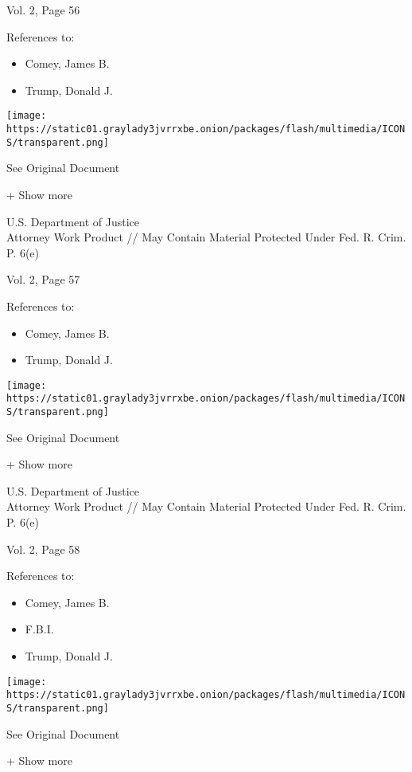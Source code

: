 Vol. 2, Page 56

References to:

\begin{itemize}
\tightlist
\item
  Comey, James B.
\item
  Trump, Donald J.
\end{itemize}

\protect\hyperlink{}{}

\texttt{[image: https://static01.graylady3jvrrxbe.onion/packages/flash/multimedia/ICONS/transparent.png]}

See Original Document

+ Show more

U.S. Department of Justice\\
Attorney Work Product // May Contain Material Protected Under Fed. R.
Crim. P. 6(e)

Vol. 2, Page 57

References to:

\begin{itemize}
\tightlist
\item
  Comey, James B.
\item
  Trump, Donald J.
\end{itemize}

\protect\hyperlink{}{}

\texttt{[image: https://static01.graylady3jvrrxbe.onion/packages/flash/multimedia/ICONS/transparent.png]}

See Original Document

+ Show more

U.S. Department of Justice\\
Attorney Work Product // May Contain Material Protected Under Fed. R.
Crim. P. 6(e)

Vol. 2, Page 58

References to:

\begin{itemize}
\tightlist
\item
  Comey, James B.
\item
  F.B.I.
\item
  Trump, Donald J.
\end{itemize}

\protect\hyperlink{}{}

\texttt{[image: https://static01.graylady3jvrrxbe.onion/packages/flash/multimedia/ICONS/transparent.png]}

See Original Document

+ Show more

